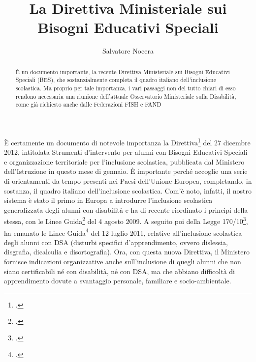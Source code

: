 \author{Salvatore Nocera}
\title{La Direttiva Ministeriale sui Bisogni Educativi Speciali}
\label{cha:nocera310113}
\begin{abstract}
È un documento importante, la recente Direttiva Ministeriale sui Bisogni Educativi Speciali (BES), che sostanzialmente completa il quadro italiano dell’inclusione scolastica. Ma proprio per tale importanza, i vari passaggi non del tutto chiari di esso rendono necessaria una riunione dell’attuale Osservatorio Ministeriale sulla Disabilità, come già richiesto anche dalle Federazioni FISH e FAND
\end{abstract}
\maketitle

È certamente un documento di notevole importanza la Direttiva\footcite{dir27Dic2012} del 27 dicembre 2012, intitolata Strumenti d'intervento per alunni con Bisogni Educativi Speciali e organizzazione territoriale per l'inclusione scolastica, pubblicata dal Ministero dell'Istruzione in questo mese di gennaio. È importante perché accoglie una serie di orientamenti da tempo presenti nei Paesi dell'Unione Europea, completando, in sostanza, il quadro italiano dell'inclusione scolastica.
Com'è noto, infatti, il nostro sistema è stato il primo in Europa a introdurre l'inclusione scolastica generalizzata degli alunni con disabilità e ha di recente riordinato i principi della stessa, con le Linee Guida\footcite{LineGuida2009} del 4 agosto 2009. A seguito poi della Legge 170/10\footcite{legge170}, ha emanato le Linee Guida\footcite{LineGuida2011} del 12 luglio 2011, relative all'inclusione scolastica degli alunni con DSA (disturbi specifici d'apprendimento, ovvero dislessia, disgrafia, dicalculia e disortografia). Ora, con questa nuova Direttiva, il Ministero fornisce indicazioni organizzative anche sull'inclusione di quegli alunni che non siano certificabili né con disabilità, né con DSA, ma che abbiano difficoltà di apprendimento dovute a svantaggio personale, familiare e socio-ambientale.

